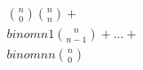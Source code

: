 \documentclass[preview]{standalone}
\begin{document}
\begin{align*}
\binom{n}{0}\binom{n}{n} + \\binom{n}{1}\binom{n}{n-1} + ... + \\binom{n}{n}\binom{n}{0}
\end{align*}
\end{document}
